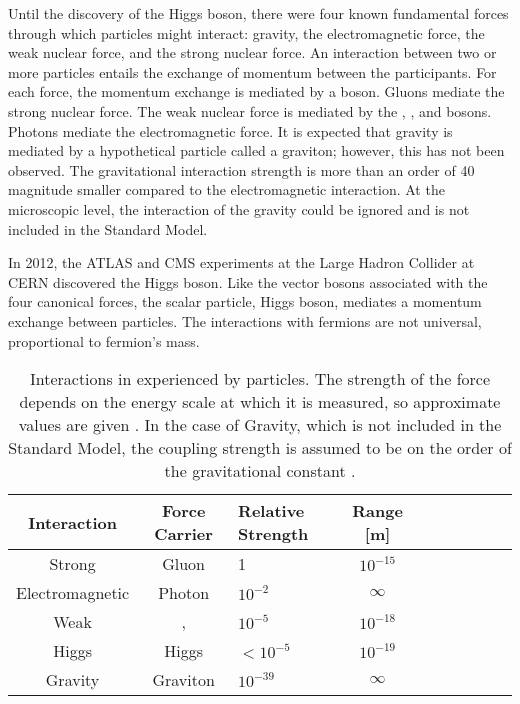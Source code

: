 Until the discovery of the Higgs boson, there were four known fundamental forces through which particles might interact: gravity, the electromagnetic force, the weak nuclear force, and the strong nuclear force.
An interaction between two or more particles entails the exchange of momentum between the participants.
For each force, the momentum exchange is mediated by a boson.
Gluons mediate the strong nuclear force.
The weak nuclear force is mediated by the \Wp, \Wm, and \Z bosons.
Photons mediate the electromagnetic force.
It is expected that gravity is mediated by a hypothetical particle called a graviton; however, this has not been observed. The gravitational interaction strength is more than an order of 40 magnitude smaller compared to the electromagnetic interaction. At the microscopic level, the interaction of the gravity could be ignored and is not included in the Standard Model.

In 2012, the ATLAS and CMS experiments at the Large Hadron Collider at CERN discovered the Higgs boson. Like the vector bosons associated with the four canonical forces, the scalar particle, Higgs boson, mediates a momentum exchange between particles. The interactions with fermions are not universal, proportional to fermion's mass.

\begin{table}[htp]
\begin{center}
\caption{Interactions in experienced by particles. The strength of the force depends on the energy scale at which it is measured, so approximate values are given \cite{robinson}. In the case of Gravity, which is not included in the Standard Model, the coupling strength is assumed to be on the order of the gravitational constant \cite{donogue}.}
{\normalsize
\begin{tabular}{c c l c c c c c c c}
\toprule
Interaction            & Force Carrier &  Relative Strength   & Range [m]  \\
\midrule
Strong           & Gluon      &  1           & $10^{-15}$ \\
Electromagnetic  & Photon     &  $10^{-2}$   & $\infty$   \\
Weak             & \W, \Z     &  $10^{-5}$   & $10^{-18}$ \\
Higgs            & Higgs      &  $<10^{-5}$  & $10^{-19}$ \\
Gravity          & Graviton   &  $ 10^{-39}$ & $\infty$   \\
\bottomrule
\end{tabular}
}
\label{tab:forces}
\end{center}
\end{table}


